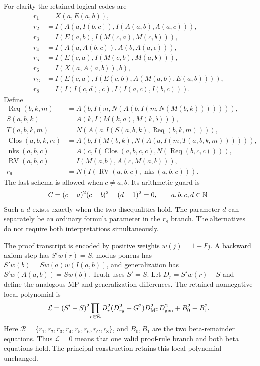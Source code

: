 \documentclass[11pt]{article}
\theoremstyle{definition}\newtheorem{remark}[theorem]{Remark}
\newcommand{\LL}{\mathcal L}
\begin{document}
For clarity the retained logical codes are
\begin{align*}
 r_1&=X(a,E(a,b)),\\
 r_2&=I(A(a,I(b,c)),I(A(a,b),A(a,c))),\\
 r_3&=I(E(a,b),I(M(c,a),M(c,b))),\\
 r_4&=I(A(a,A(b,c)),A(b,A(a,c))),\\
 r_5&=I(E(c,a),I(M(c,b),M(a,b))),\\
 r_6&=I(X(a,A(a,b)),b),\\
 r_G&=I(E(c,a),I(E(c,b),A(M(a,b),E(a,b)))),\\
 r_8&=I(I(I(c,d),a),I(I(a,c),I(b,c))).
\end{align*}
Define
\begin{align*}
 \operatorname{Req}(b,k,m)
 &=A(b,I(m,N(A(b,I(m,N(M(b,k))))))),\\
 S(a,b,k)&=A(k,I(M(k,a),M(k,b))),\\
 T(a,b,k,m)&=N(A(a,I(S(a,b,k),\operatorname{Req}(b,k,m)))),\\
 \operatorname{Clos}(a,b,k,m)
 &=A(b,I(M(b,k),N(A(a,I(m,T(a,b,k,m)))))),\\
 \operatorname{nks}(a,b,c)&=A(c,I(\operatorname{Clos}(a,b,c,c),
                   N(\operatorname{Req}(b,c,c)))),\\
 \operatorname{RV}(a,b,c)&=I(M(a,b),A(c,M(a,b))),\\
 r_9&=N(I(\operatorname{RV}(a,b,c),\operatorname{nks}(a,b,c))).
\end{align*}
The last schema is allowed when $c\ne a,b$. Its arithmetic guard is
\[
 G=(c-a)^2(c-b)^2-(d+1)^2=0,\qquad a,b,c,d\in\mathbb N.
\]
Such a $d$ exists exactly when the two disequalities hold. The parameter
$d$ can separately be an ordinary formula parameter in the $r_8$ branch.
The alternatives do not require both interpretations simultaneously.

The proof transcript is encoded by positive weights $w(j)=1+Fj$.
A backward axiom step has $S'w(r)=S$, modus ponens has
$S'w(b)=S w(a)w(I(a,b))$, and generalization has
$S'w(A(a,b))=S w(b)$. Truth uses $S'=S$.
Let $D_r=S'w(r)-S$ and define the analogous MP and generalization
differences. The retained nonnegative local polynomial is
\[
 \LL=(S'-S)^2\!\prod_{r\in\mathcal R}D_r^2
       (D_{r_9}^2+G^2)D_{\rm MP}^2D_{\rm gen}^2+B_0^2+B_1^2.
\]
Here $\mathcal R=\{r_1,r_2,r_3,r_4,r_5,r_6,r_G,r_8\}$, and $B_0,B_1$ are the two beta-remainder equations. Thus $\LL=0$
means that one valid proof-rule branch and both beta equations hold.
The principal construction retains this local polynomial unchanged.
\end{document}

